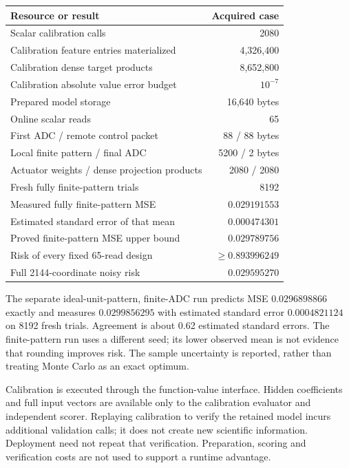 \documentclass[11pt]{article}
\begin{document}
\begin{center}
\begin{tabularx}{\textwidth}{@{}X r@{}}
\toprule
Resource or result & Acquired case \\
\midrule
Scalar calibration calls & 2080 \\
Calibration feature entries materialized & 4,326,400 \\
Calibration dense target products & 8,652,800 \\
Calibration absolute value error budget & $10^{-7}$ \\
Prepared model storage & 16,640 bytes \\
Online scalar reads & 65 \\
First ADC / remote control packet & 88 / 88 bytes \\
Local finite pattern / final ADC & 5200 / 2 bytes \\
Actuator weights / dense projection products & 2080 / 2080 \\
Fresh fully finite-pattern trials & 8192 \\
Measured fully finite-pattern MSE & $0.029191553$ \\
Estimated standard error of that mean & $0.000474301$ \\
Proved finite-pattern MSE upper bound & $0.029789756$ \\
Risk of every fixed 65-read design & $\ge0.893996249$ \\
Full 2144-coordinate noisy risk & $0.029595270$ \\
\bottomrule
\end{tabularx}
\end{center}

The separate ideal-unit-pattern, finite-ADC run predicts MSE $0.0296898866$ exactly and measures $0.0299856295$ with estimated standard error $0.0004821124$ on 8192 fresh trials. Agreement is about 0.62 estimated standard errors. The finite-pattern run uses a different seed; its lower observed mean is not evidence that rounding improves risk. The sample uncertainty is reported, rather than treating Monte Carlo as an exact optimum.

Calibration is executed through the function-value interface. Hidden coefficients and full input vectors are available only to the calibration evaluator and independent scorer. Replaying calibration to verify the retained model incurs additional validation calls; it does not create new scientific information. Deployment need not repeat that verification. Preparation, scoring and verification costs are not used to support a runtime advantage.
\end{document}
